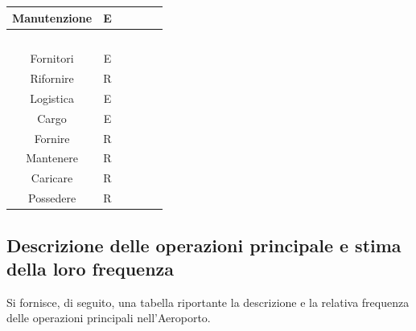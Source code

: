 \begin{tabular}{ | c  c  c | c  c  c | }
	\hline
	\textsf{\small Manutenzione} & \textsf{\small E} & \textsf{\small $ $} & \textsf{\small } & \textsf{\small } & \textsf{\small $ $}\\
	\hline
	\textsf{\small } & \textsf{\small } & \textsf{\small $ $} & \textsf{\small } & \textsf{\small } & \textsf{\small $ $}\\
	\hline
	\textsf{\small Fornitori} & \textsf{\small E} & \textsf{\small $ $} & \textsf{\small } & \textsf{\small } & \textsf{\small $ $}\\
	\hline
	\textsf{\small Rifornire} & \textsf{\small R} & \textsf{\small $ $} & \textsf{\small } & \textsf{\small } & \textsf{\small $ $}\\
	\hline
	\textsf{\small Logistica} & \textsf{\small E} & \textsf{\small $ $} & \textsf{\small } & \textsf{\small } & \textsf{\small $ $}\\
	\hline
	\textsf{\small Cargo} & \textsf{\small E} & \textsf{\small $ $} & \textsf{\small } & \textsf{\small } & \textsf{\small $ $}\\
	\hline
	\textsf{\small Fornire} & \textsf{\small R} & \textsf{\small $ $} & \textsf{\small } & \textsf{\small } & \textsf{\small $ $}\\
	\hline
	\textsf{\small Mantenere} & \textsf{\small R} & \textsf{\small $ $} & \textsf{\small } & \textsf{\small } & \textsf{\small $ $}\\
	\hline
	\textsf{\small Caricare} & \textsf{\small R} & \textsf{\small $ $} & \textsf{\small } & \textsf{\small } & \textsf{\small $ $}\\
	\hline
	\textsf{\small Possedere} & \textsf{\small R} & \textsf{\small $ $} & \textsf{\small } & \textsf{\small } & \textsf{\small $ $}\\
	\hline
\end{tabular}


\newpage

\subsection{Descrizione delle operazioni principale e stima della loro frequenza}


\textsf{\small Si fornisce, di seguito, una tabella riportante la descrizione e la relativa frequenza delle operazioni principali nell'Aeroporto.}\\


